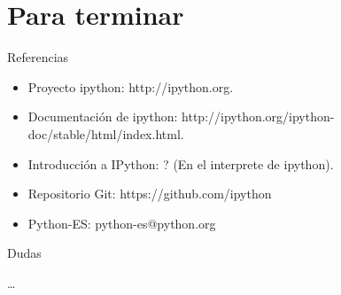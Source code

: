 \documentclass[10pt]{beamer}
\begin{document}
  \section*{Para terminar}
  
  \begin{frame}{Referencias}
    \begin{itemize}
      \item Proyecto ipython: http://ipython.org.
      \item Documentación de ipython: http://ipython.org/ipython-doc/stable/html/index.html.
      \item Introducción a IPython: ? (En el interprete de ipython).
      \item Repositorio Git: https://github.com/ipython
      \item Python-ES: python-es@python.org
    \end{itemize}
  \end{frame}

  \begin{frame}{Dudas}
    \begin{center}
      \dots
    \end{center}
  \end{frame}
\end{document}
